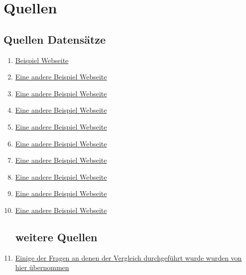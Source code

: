 \documentclass[12pt]{article}
\begin{document}
	\section{Quellen}
	
	\subsection{Quellen Datensätze}
	
	\begin{enumerate}
		\item \href{https://example.com}{Beispiel Webseite}
		\item \href{https://example.org}{Eine andere Beispiel Webseite}
		\item \href{https://example.org}{Eine andere Beispiel Webseite}
		\item \href{https://example.org}{Eine andere Beispiel Webseite}
		\item \href{https://example.org}{Eine andere Beispiel Webseite}
		\item \href{https://example.org}{Eine andere Beispiel Webseite}
		\item \href{https://example.org}{Eine andere Beispiel Webseite}
		\item \href{https://example.org}{Eine andere Beispiel Webseite}
		\item \href{https://example.org}{Eine andere Beispiel Webseite}
		\item \href{https://example.org}{Eine andere Beispiel Webseite}
		
		\subsection{weitere Quellen}
		\item \href{https://www.gapminder.org/}{Einige der Fragen an denen der Vergleich durchgeführt wurde wurden von hier übernommen}
		
	\end{enumerate}
	
\end{document}
